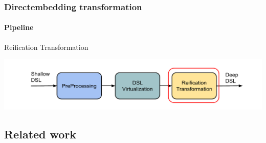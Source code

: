 \documentclass[xcolor=dvipsnames]{beamer}
\theoremstyle{definition}
\begin{document}
\begin{frame}[fragile]
    \frametitle{Directembedding transformation}
    \framesubtitle{Pipeline}
    \begin{block}{Reification Transformation}
        
    \end{block}
    \begin{center}
        \includegraphics[width=\textwidth]{img/pipeline4.pdf}
    \end{center}
\end{frame}


\subsection{Related work} %
\label{sub:Related work}

\end{document}
